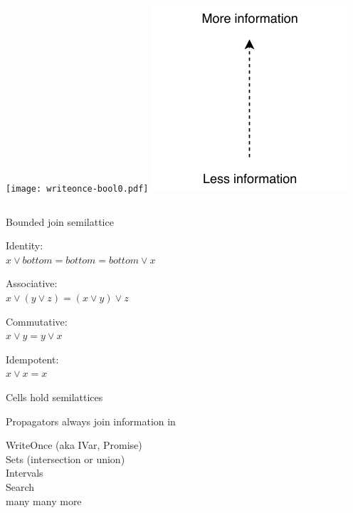 \documentclass[UKenglish,usenames,dvipsnames,svgnames,table,aspectratio=169,mathserif]{beamer}
\newcommand{\nl}{\vspace{\baselineskip}}
\begin{document}
\begin{frame}
\begin{columns}
\texttt{[image: writeonce-bool0.pdf]}
\includegraphics[scale=1.3]{set/more-info.pdf}
\end{columns}
\end{frame}


\begin{frame}[fragile]
\centering \huge
Bounded join semilattice
\nl
\large

Identity: \\
$x \vee bottom = bottom = bottom \vee x$
\nl

Associative: \\
$x \vee (y \vee z) = (x \vee y) \vee z$
\nl

Commutative: \\
$x \vee y = y \vee x$
\nl

Idempotent: \\
$x \vee x = x$

\end{frame}


\begin{frame}
\LARGE \centering

Cells hold semilattices

Propagators always join information in
\end{frame}


\begin{frame}

\centering
WriteOnce (aka IVar, Promise) \\
Sets (intersection or union) \\
Intervals \\
Search \\
many many more
\end{frame}


\end{document}
